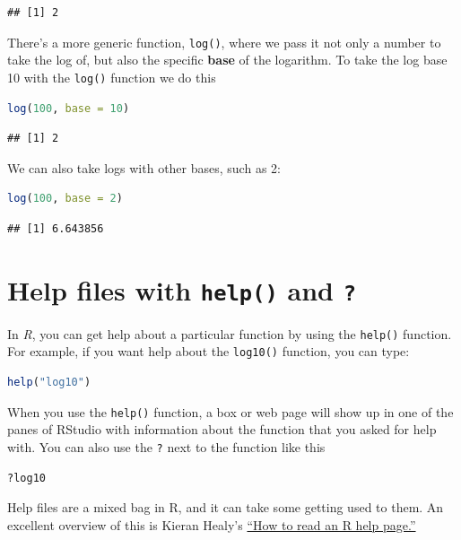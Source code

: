 \documentclass[
]{book}
\newcommand{\passthrough}[1]{#1}
\begin{document}
\begin{lstlisting}
## [1] 2
\end{lstlisting}

There's a more generic function, \passthrough{\lstinline!log()!}, where we pass it not only a number to take the log of, but also the specific \textbf{base} of the logarithm. To take the log base 10 with the \passthrough{\lstinline!log()!} function we do this

\begin{lstlisting}[language=R]
log(100, base = 10)
\end{lstlisting}

\begin{lstlisting}
## [1] 2
\end{lstlisting}

We can also take logs with other bases, such as 2:

\begin{lstlisting}[language=R]
log(100, base = 2)
\end{lstlisting}

\begin{lstlisting}
## [1] 6.643856
\end{lstlisting}

\hypertarget{help-files-with-help-and}{%
\section{\texorpdfstring{Help files with \texttt{help()} and \texttt{?}}{Help files with help() and ?}}\label{help-files-with-help-and}}

In \emph{R}, you can get help about a particular function by using the \passthrough{\lstinline!help()!} function. For example, if you want help about the \passthrough{\lstinline!log10()!} function, you can type:

\begin{lstlisting}[language=R]
help("log10")
\end{lstlisting}

When you use the \passthrough{\lstinline!help()!} function, a box or web page will show up in one of the panes of RStudio with information about the function that you asked for help with. You can also use the \passthrough{\lstinline!?!} next to the function like this

\begin{lstlisting}[language=R]
?log10
\end{lstlisting}

Help files are a mixed bag in R, and it can take some getting used to them. An excellent overview of this is Kieran Healy's \href{https://socviz.co/appendix.html}{``How to read an R help page.''}
\end{document}
